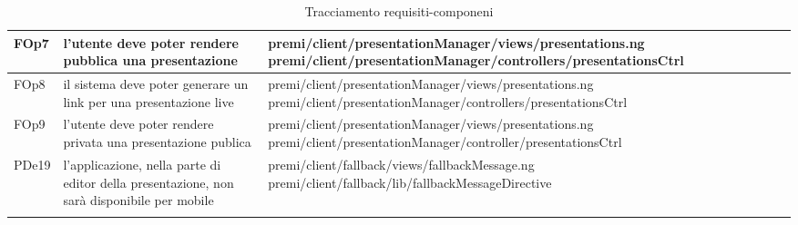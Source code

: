\begin{longtable}{|l|p{5cm}|p{7cm}|}
\hline
FOp7 & l'utente deve poter rendere pubblica una presentazione & \hspace{0pt}premi/client/presentationManager/views/presentations.ng \linebreak \linebreak premi/client/presentationManager/controllers/presentationsCtrl \\
\hline
FOp8 & il sistema deve poter generare un link per una presentazione live & \hspace{0pt}premi/client/presentationManager/views/presentations.ng \linebreak \linebreak premi/client/presentationManager/controllers/presentationsCtrl \\
\hline
FOp9 & l'utente deve poter rendere privata una presentazione publica & \hspace{0pt}premi/client/presentationManager/views/presentations.ng \linebreak \linebreak premi/client/presentationManager/controller/presentationsCtrl \\
\hline
PDe19 & l'applicazione, nella parte
di editor della presentazione, non sarà disponibile per
mobile & premi/client/fallback/views/fallbackMessage.ng \linebreak \linebreak premi/client/fallback/lib/fallbackMessageDirective \\
\hline
\caption{Tracciamento requisiti-componeni}
\end{longtable}